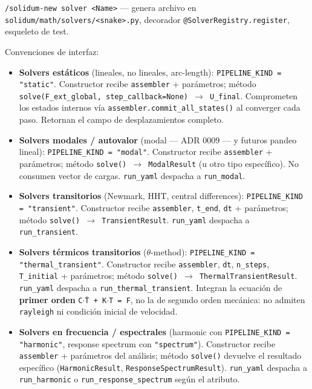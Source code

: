 \documentclass[11pt,letterpaper,oneside]{report}
\begin{document}
\texttt{/solidum-new solver <Name>} --- genera archivo en \texttt{solidum/math/solvers/<snake>.py}, decorador \texttt{@SolverRegistry.register}, esqueleto de test.

Convenciones de interfaz:

\begin{itemize}
  \item \textbf{Solvers estáticos} (lineales, no lineales, arc-length): \texttt{PIPELINE\_KIND = "static"}. Constructor recibe \texttt{assembler} + parámetros; método \texttt{solve(F\_ext\_global, step\_callback=None) \ensuremath{\to} U\_final}. Comprometen los estados internos vía \texttt{assembler.commit\_all\_states()} al converger cada paso. Retornan el campo de desplazamientos completo.
  \item \textbf{Solvers modales / autovalor} (modal --- ADR 0009 --- y futuros pandeo lineal): \texttt{PIPELINE\_KIND = "modal"}. Constructor recibe \texttt{assembler} + parámetros; método \texttt{solve() \ensuremath{\to} ModalResult} (u otro tipo específico). No consumen vector de cargas. \texttt{run\_yaml} despacha a \texttt{run\_modal}.
  \item \textbf{Solvers transitorios} (Newmark, HHT, central differences): \texttt{PIPELINE\_KIND = "transient"}. Constructor recibe \texttt{assembler}, \texttt{t\_end}, \texttt{dt} + parámetros; método \texttt{solve() \ensuremath{\to} TransientResult}. \texttt{run\_yaml} despacha a \texttt{run\_transient}.
  \item \textbf{Solvers térmicos transitorios} (\ensuremath{\theta}-method): \texttt{PIPELINE\_KIND = "thermal\_transient"}. Constructor recibe \texttt{assembler}, \texttt{dt}, \texttt{n\_steps}, \texttt{T\_initial} + parámetros; método \texttt{solve() \ensuremath{\to} ThermalTransientResult}. \texttt{run\_yaml} despacha a \texttt{run\_thermal\_transient}. Integran la ecuación de \textbf{primer orden} \texttt{C\ensuremath{\cdot}Ṫ + K\ensuremath{\cdot}T = F}, no la de segundo orden mecánica: no admiten \texttt{rayleigh} ni condición inicial de velocidad.
  \item \textbf{Solvers en frecuencia / espectrales} (harmonic con \texttt{PIPELINE\_KIND = "harmonic"}, response spectrum con \texttt{"spectrum"}). Constructor recibe \texttt{assembler} + parámetros del análisis; método \texttt{solve()} devuelve el resultado específico (\texttt{HarmonicResult}, \texttt{ResponseSpectrumResult}). \texttt{run\_yaml} despacha a \texttt{run\_harmonic} o \texttt{run\_response\_spectrum} según el atributo.
\end{itemize}
\end{document}
